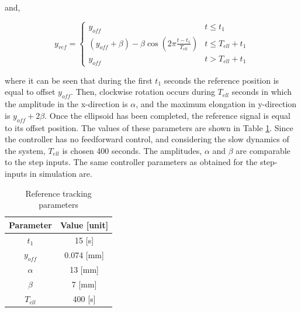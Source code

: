 and,


\begin{equation}
    y_{ref} = \begin{cases} 
       y_{off} &  t \leq t_1 \\
     (y_{off} +\beta) -  \beta \cos(2\pi \frac{t - t_1}{T_{ell}}) & t \leq T_{ell} + t_1 \\
     y_{off} & t > T_{ell} + t_1
   \end{cases} 
\end{equation}

where it can be seen that during the first $t_1$ seconds the reference position is equal to offset $y_{off}$. Then, clockwise rotation occurs during $T_{ell}$ seconds in which the amplitude in the x-direction is $\alpha$, and the maximum elongation in y-direction is $y_{off} + 2\beta$. Once the ellipsoid has been completed, the reference signal is equal to its offset position. The values of these parameters are shown in Table \ref{tab5:refparams}. Since the controller has no feedforward control, and considering the slow dynamics of the system, $T_{ell}$ is chosen 400 seconds. The amplitudes, $\alpha$ and $\beta$ are comparable to the step inputs. The same controller parameters as obtained for the step-inputs in simulation are.


\begin{table}[H]
    \centering
    \caption{Reference tracking parameters}
    \begin{tabular}{|c|c|} \hline
   \textbf{Parameter}  & \textbf{Value [unit]} \\ \hline
    $t_1$ &   15 [s]  \\ 
    $y_{off}$ & 0.074 [mm] \\
    $\alpha$ & 13 [mm] \\
    $\beta$ & 7 [mm] \\
    $T_{ell}$ & 400 [s] \\ \hline
\end{tabular}
    \label{tab5:refparams}
\end{table}


